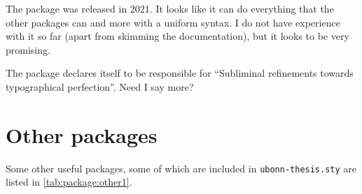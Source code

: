 The package  was released in 2021.
It looks like it can do everything that the other packages can and more with a uniform syntax.
I do not have experience with it so far (apart from skimming the documentation),
but it looks to be very promising.

The package  declares itself to be responsible for
\enquote{Subliminal refinements towards typographical perfection}.
Need I say more?

\section{Other packages}%
\label{sec:package:other}

Some other useful packages, some of which are included in
\texttt{ubonn-thesis.sty} are listed in
\cref{tab:package:other1}.

